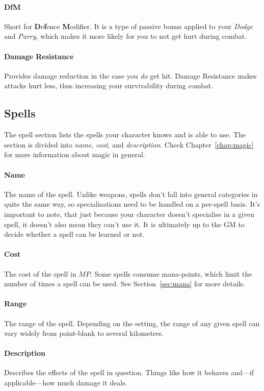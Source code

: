 \paragraph{DfM} Short for \textbf{D}e\textbf{f}ence \textbf{M}odifier.
It is a type of passive bonus applied to your \textit{Dodge} and \textit{Parry}, which makes it more likely for you to not get hurt during combat.

\paragraph{Damage Resistance} Provides damage reduction in the case you \textit{do} get hit.
Damage Resistance makes attacks hurt less, thus increasing your survivability during combat.

\subsection{Spells}
The spell section lists the spells your character knows and is able to use.
The section is divided into \textit{name}, \textit{cost}, and \textit{description}.
Check Chapter~\ref{chap:magic} for more information about magic in general.

\paragraph{Name} The name of the spell.
Unlike weapons, spells don't fall into general categories in quite the same way, so specialisations need to be handled on a per-spell basis.
It's important to note, that just because your character doesn't specialise in a given spell, it doesn't also mean they can't use it.
It is ultimately up to the GM to decide whether a spell can be learned or not.

\paragraph{Cost} The cost of the spell in $MP$.
Some spells consume mana-points, which limit the number of times a spell can be used.
See Section~\ref{sec:mana} for more details.

\paragraph{Range} The range of the spell.
Depending on the setting, the range of any given spell can vary widely from point-blank to several kilometres.

\paragraph{Description} Describes the effects of the spell in question.
Things like how it behaves and---if applicable---how much damage it deals.

